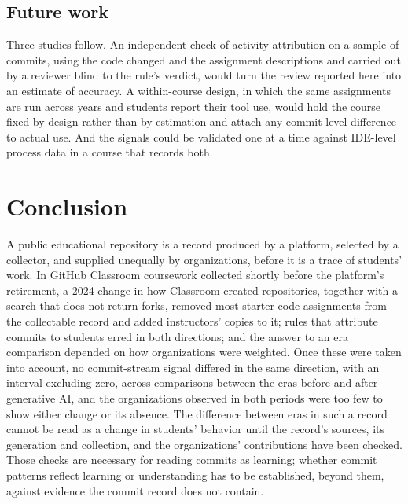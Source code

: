 \documentclass[acmsmall,screen,review,anonymous]{acmart}
\begin{document}
\subsection{Future work}

Three studies follow. An independent check of activity attribution on a sample of commits, using the code changed and the assignment descriptions and carried out by a reviewer blind to the rule's verdict, would turn the review reported here into an estimate of accuracy. A within-course design, in which the same assignments are run across years and students report their tool use, would hold the course fixed by design rather than by estimation and attach any commit-level difference to actual use. And the signals could be validated one at a time against IDE-level process data in a course that records both.

\section{Conclusion}
\label{sec:conclusion}

A public educational repository is a record produced by a platform, selected by a collector, and supplied unequally by organizations, before it is a trace of students' work. In GitHub Classroom coursework collected shortly before the platform's retirement, a 2024 change in how Classroom created repositories, together with a search that does not return forks, removed most starter-code assignments from the collectable record and added instructors' copies to it; rules that attribute commits to students erred in both directions; and the answer to an era comparison depended on how organizations were weighted. Once these were taken into account, no commit-stream signal differed in the same direction, with an interval excluding zero, across comparisons between the eras before and after generative AI, and the organizations observed in both periods were too few to show either change or its absence. The difference between eras in such a record cannot be read as a change in students' behavior until the record's sources, its generation and collection, and the organizations' contributions have been checked. Those checks are necessary for reading commits as learning; whether commit patterns reflect learning or understanding has to be established, beyond them, against evidence the commit record does not contain.
\end{document}

